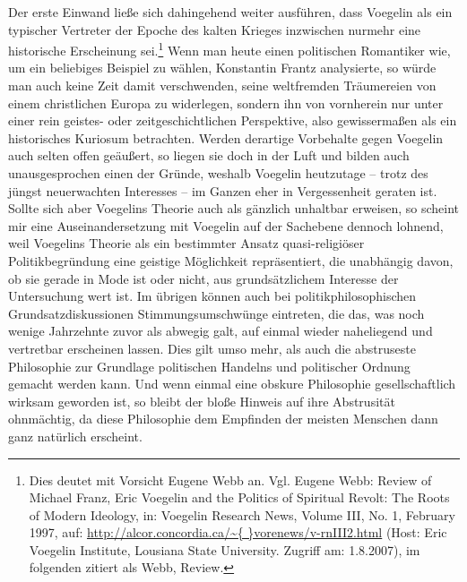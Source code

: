 Der erste Einwand ließe sich dahingehend weiter ausführen, dass Voegelin als
ein typischer Vertreter der Epoche des kalten Krieges inzwischen nurmehr eine
historische Erscheinung sei.\footnote{Dies deutet mit Vorsicht Eugene Webb an.
  Vgl. Eugene Webb: Review of Michael Franz, Eric Voegelin and the Politics of
  Spiritual Revolt: The Roots of Modern Ideology, in: Voegelin Research News,
  Volume III, No. 1, February 1997, auf: \url{http://alcor.concordia.ca/\~{
  }vorenews/v-rnIII2.html} (Host: Eric Voegelin Institute, Lousiana State
  University. Zugriff am: 1.8.2007), im folgenden zitiert als Webb, Review.}
Wenn man heute einen politischen Romantiker wie, um ein beliebiges Beispiel zu
wählen, Konstantin Frantz analysierte, so würde man auch keine Zeit damit
verschwenden, seine weltfremden Träumereien von einem christlichen Europa zu
widerlegen, sondern ihn von vornherein nur unter einer rein geistes- oder
zeitgeschichtlichen Perspektive, also gewissermaßen als ein historisches
Kuriosum betrachten.  Werden derartige Vorbehalte gegen Voegelin auch selten
offen geäußert, so liegen sie doch in der Luft und bilden auch unausgesprochen
einen der Gründe, weshalb Voegelin heutzutage -- trotz des jüngst neuerwachten
Interesses -- im Ganzen eher in Vergessenheit geraten ist. Sollte sich aber
Voegelins Theorie auch als gänzlich unhaltbar erweisen, so scheint mir eine
Auseinandersetzung mit Voegelin auf der Sachebene dennoch lohnend, weil
Voegelins Theorie als ein bestimmter Ansatz quasi-religiöser Politikbegründung
eine geistige Möglichkeit repräsentiert, die unabhängig davon, ob sie gerade
in Mode ist oder nicht, aus grundsätzlichem Interesse der Untersuchung wert
ist. Im übrigen können auch bei politikphilosophischen Grundsatzdiskussionen
Stimmungsumschwünge eintreten, die das, was noch wenige Jahrzehnte zuvor als
abwegig galt, auf einmal wieder naheliegend und vertretbar erscheinen lassen.
Dies gilt umso mehr, als auch die abstruseste Philosophie zur Grundlage
politischen Handelns und politischer Ordnung gemacht werden kann. Und wenn
einmal eine obskure Philosophie gesellschaftlich wirksam geworden ist, so
bleibt der bloße Hinweis auf ihre Abstrusität ohnmächtig, da diese Philosophie
dem Empfinden der meisten Menschen dann ganz natürlich erscheint.

